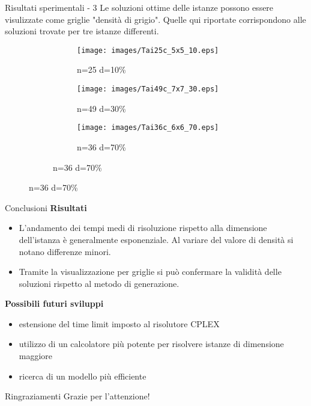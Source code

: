 \documentclass[a4paper]{beamer}
\begin{document}
\begin{frame}{Risultati sperimentali - 3}
Le soluzioni ottime delle istanze possono essere visulizzate come griglie "densità di grigio".
Quelle qui riportate corrispondono alle soluzioni trovate per tre istanze differenti.
\vfill
\begin{figure}[h!]
    \centering
    \begin{subfigure}[b]{\textwidth}
        \centering
        \begin{subfigure}[b]{0.25\textwidth}
            \texttt{[image: images/Tai25c\_5x5\_10.eps]}
			\caption{n=25 d=10\%}
        \end{subfigure}
        \hspace{1em}
        \begin{subfigure}[b]{0.25\textwidth}
            \texttt{[image: images/Tai49c\_7x7\_30.eps]}
			\caption{n=49 d=30\%}
        \end{subfigure}
        \hspace{1em}
        \begin{subfigure}[b]{0.25\textwidth}
            \texttt{[image: images/Tai36c\_6x6\_70.eps]}
			\caption{n=36 d=70\%}
        \end{subfigure}
     \end{subfigure}
\end{figure}
\end{frame}

\begin{frame}{Conclusioni}
\textbf{Risultati}\\
\begin{itemize}
\item L'andamento dei tempi medi di risoluzione rispetto alla dimensione dell'istanza è generalmente esponenziale. \newline Al variare del valore di densità si notano differenze minori.
\item Tramite la visualizzazione per griglie si può confermare la validità delle soluzioni rispetto al metodo di generazione.
\end{itemize}
\vfill
\textbf{Possibili futuri sviluppi}\\
\begin{itemize}
\item estensione del time limit imposto al risolutore CPLEX 
\item utilizzo di un calcolatore più potente per risolvere istanze di dimensione maggiore
\item ricerca di un modello più efficiente
\end{itemize}
\end{frame}

\begin{frame}{Ringraziamenti}
\centering
\LARGE Grazie per l'attenzione!
\end{frame}

\begin{frame}
\maketitle
\end{frame}
\end{document}

